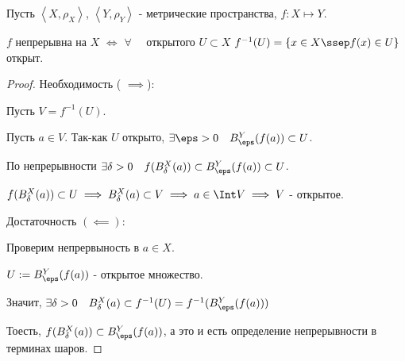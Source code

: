 \begin{theorem} \label{cont:preimage_of_open}\thmslashn

    Пусть $\left<X, \rho_{X}\right>$, $\left<Y, \rho_{Y}\right>$ - метрические пространства, $f : X \mapsto Y$.

    $f$ непрерывна на $X$ $\iff$ $\forall{}\quad $ открытого $U \subset X$ $f^{-1}(U) = \{x\in X \ssep f(x)\in U\} $ открыт.
    \begin{proof} \thmslashn
    
        Необходимость ( $\implies$):

        Пусть $V = f^{-1}(U)$.

        Пусть $a\in V$. Так-как $U$ открыто, $\exists{\eps > 0}\quad B^{Y}_{\eps}(f(a)) \subset U$.

        По непрерывности $\exists{\delta > 0}\quad f(B^{X}_{\delta}(a)) \subset B^{Y}_{\eps}(f(a)) \subset U$.

        $f(B^{X}_{\delta}(a)) \subset U \implies B^{X}_{\delta}(a) \subset V \implies a\in \Int V \implies V$ - открытое.

        Достаточность $(\impliedby)$:

        Проверим непрервыность в $a\in X$.

        $U := B^{Y}_{\eps}(f(a))$ - открытое множество.

        Значит, $\exists{\delta > 0}\quad B^{X}_{\delta}(a) \subset f^{-1}(U) = f^{-1}(B^{Y}_{\eps}(f(a)))$
        
        Тоесть, $f(B^{X}_{\delta}(a)) \subset B^{Y}_{\eps}(f(a))$, а это и есть определение непрерывности в терминах шаров.
    \end{proof}
\end{theorem}
